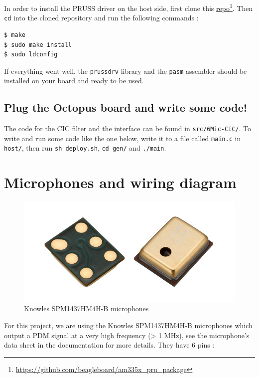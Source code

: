 \documentclass[]{report}
\begin{document}
In order to install the PRUSS driver on the host side, first clone this
\href{https://github.com/beagleboard/am335x_pru_package}{repo}\footnote{\url{https://github.com/beagleboard/am335x_pru_package}}. Then
\texttt{cd} into the cloned repository and run the following commands :

\begin{verbatim}
$ make
$ sudo make install
$ sudo ldconfig
\end{verbatim}

If everything went well, the \texttt{prussdrv} library and the
\texttt{pasm} assembler should be installed on your board and ready to
be used.

\hypertarget{plug-the-octopus-board-and-write-some-code}{%
\subsection{Plug the Octopus board and write some
code!}\label{plug-the-octopus-board-and-write-some-code}}

The code for the CIC filter and the interface can be found in
\texttt{src/6Mic-CIC/}. To write and run some code like the one below,
write it to a file called \texttt{main.c} in \texttt{host/}, then run
\texttt{sh\ deploy.sh}, \texttt{cd\ gen/} and \texttt{./main}.



\hypertarget{microphones-and-wiring-diagram}{%
\section{Microphones and wiring
diagram}\label{microphones-and-wiring-diagram}}

\begin{figure}[h]
\centering
\includegraphics[width=0.6\linewidth]{Pictures/mics.png}
\caption{Knowles SPM1437HM4H-B microphones}
\end{figure}

For this project, we are using the Knowles SPM1437HM4H-B microphones
which output a PDM signal at a very high frequency (\textgreater{} 1
MHz), see the microphone's data sheet in the documentation for more
details. They have 6 pins :
\end{document}
